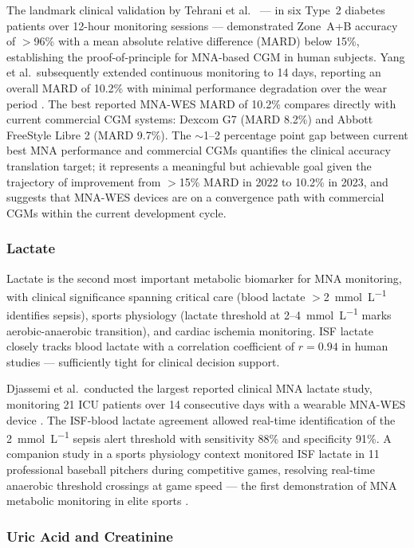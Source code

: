 \documentclass[review,1p]{elsarticle}
\begin{document}
The landmark clinical validation by Tehrani et al.\ \cite{Tehrani2022NatBiomedEng} — in six Type~2 diabetes patients over 12-hour monitoring sessions — demonstrated Zone~A+B accuracy of $>$96\% with a mean absolute relative difference (MARD) below 15\%, establishing the proof-of-principle for MNA-based CGM in human subjects. Yang et al.\ subsequently extended continuous monitoring to 14 days, reporting an overall MARD of 10.2\% with minimal performance degradation over the wear period \cite{Yang2023CGM14day}. The best reported MNA-WES MARD of 10.2\% compares directly with current commercial CGM systems: Dexcom G7 (MARD 8.2\%) and Abbott FreeStyle Libre 2 (MARD 9.7\%). The $\sim$1--2 percentage point gap between current best MNA performance and commercial CGMs quantifies the clinical accuracy translation target; it represents a meaningful but achievable goal given the trajectory of improvement from $>$15\% MARD in 2022 to 10.2\% in 2023, and suggests that MNA-WES devices are on a convergence path with commercial CGMs within the current development cycle.

\subsubsection{Lactate}

Lactate is the second most important metabolic biomarker for MNA monitoring, with clinical significance spanning critical care (blood lactate $>$2~mmol~L\textsuperscript{$-1$} identifies sepsis), sports physiology (lactate threshold at 2--4~mmol~L\textsuperscript{$-1$} marks aerobic-anaerobic transition), and cardiac ischemia monitoring. ISF lactate closely tracks blood lactate with a correlation coefficient of $r = 0.94$ in human studies \cite{Djassemi2026ACSsens} — sufficiently tight for clinical decision support.

Djassemi et al.\ conducted the largest reported clinical MNA lactate study, monitoring 21 ICU patients over 14 consecutive days with a wearable MNA-WES device \cite{Djassemi2026ACSsens}. The ISF-blood lactate agreement allowed real-time identification of the 2~mmol~L\textsuperscript{$-1$} sepsis alert threshold with sensitivity 88\% and specificity 91\%. A companion study in a sports physiology context monitored ISF lactate in 11 professional baseball pitchers during competitive games, resolving real-time anaerobic threshold crossings at game speed — the first demonstration of MNA metabolic monitoring in elite sports \cite{Djassemi2026BBE}.

\subsubsection{Uric Acid and Creatinine}
\end{document}
